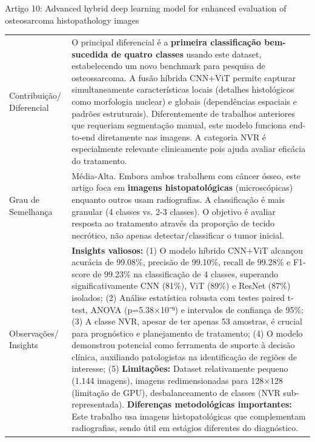 \documentclass[12pt, a4paper]{article}
\begin{document}
\begin{fichabox}{Artigo 10: Advanced hybrid deep learning model for enhanced evaluation of osteosarcoma histopathology images}
\begin{longtable}{@{} B L{10.5cm} @{}}
    Contribuição/ Diferencial & O principal diferencial é a \textbf{primeira classificação bem-sucedida de quatro classes} usando este dataset, estabelecendo um novo benchmark para pesquisa de osteossarcoma. A fusão híbrida CNN+ViT permite capturar simultaneamente características locais (detalhes histológicos como morfologia nuclear) e globais (dependências espaciais e padrões estruturais). Diferentemente de trabalhos anteriores que requeriam segmentação manual, este modelo funciona end-to-end diretamente nas imagens. A categoria NVR é especialmente relevante clinicamente pois ajuda avaliar eficácia do tratamento. \\
    \addlinespace

    Grau de Semelhança & Média-Alta. Embora ambos trabalhem com câncer ósseo, este artigo foca em \textbf{imagens histopatológicas} (microscópicas) enquanto outros usam radiografias. A classificação é mais granular (4 classes vs. 2-3 classes). O objetivo é avaliar resposta ao tratamento através da proporção de tecido necrótico, não apenas detectar/classificar o tumor inicial. \\
    \addlinespace

    Observações/ Insights & \textbf{Insights valiosos:} (1) O modelo híbrido CNN+ViT alcançou acurácia de 99.08\%, precisão de 99.10\%, recall de 99.28\% e F1-score de 99.23\% na classificação de 4 classes, superando significativamente CNN (81\%), ViT (89\%) e ResNet (87\%) isolados; (2) Análise estatística robusta com testes paired t-test, ANOVA (p=5.38×10⁻⁹) e intervalos de confiança de 95\%; (3) A classe NVR, apesar de ter apenas 53 amostras, é crucial para prognóstico e planejamento de tratamento; (4) O modelo demonstrou potencial como ferramenta de suporte à decisão clínica, auxiliando patologistas na identificação de regiões de interesse; (5) \textbf{Limitações:} Dataset relativamente pequeno (1.144 imagens), imagens redimensionadas para 128×128 (limitação de GPU), desbalanceamento de classes (NVR sub-representada). \textbf{Diferenças metodológicas importantes:} Este trabalho usa imagens histopatológicas que complementam radiografias, sendo útil em estágios diferentes do diagnóstico. \\

    \bottomrule
\end{longtable}
\end{fichabox}
\end{document}
